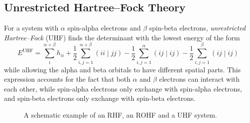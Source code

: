 \documentclass{article}
\theoremstyle{plain}\theoremheaderfont{\normalfont\itshape}\theorembodyfont{\rmfamily}\theoremseparator{.}\newtheorem*{rem}{Remark}\newtheorem*{ex}{Example}\newtheorem*{proof}{Proof}\newtheorem*{altp}{Alternative proof}
\theoremstyle{plain}\theoremheaderfont{\normalfont\bfseries}\theorembodyfont{\rmfamily}\theoremseparator{.}\newtheorem{thm}{Theorem}[section]\newtheorem{lem}[thm]{Lemma}\newtheorem{prop}[thm]{Proposition}\newtheorem*{cor}{Corollary}\newtheorem{defn}[thm]{Definition}\newtheorem{clm}[thm]{Claim}\newtheorem{clminproof}{Claim}
\theoremstyle{break}\theoremheaderfont{\normalfont\itshape}\theorembodyfont{\rmfamily}\theoremseparator{.\medskip}\newtheorem*{proofskip}{Proof}\newtheorem*{exs}{Examples}\newtheorem*{rems}{Remarks}
\theoremstyle{break}\theoremheaderfont{\normalfont\bfseries}\theorembodyfont{\rmfamily}\theoremseparator{.\medskip}\newtheorem{lemskip}[thm]{Lemma}\newtheorem{defnskip}[thm]{Definition}\newtheorem{propskip}[thm]{Proposition}\newtheorem{thmskip}[thm]{Theorem}
\numberwithin{equation}{section}
\newcommand{\bracket}[2]{\left( #1 \middle| #2 \right)}
\newcommand{\x}{_{\text{x}}}
\begin{document}
    \subsection{Unrestricted Hartree--Fock Theory}
    For a system with \(\alpha\) spin-alpha electrons and \(\beta\) spin-beta electrons, \textit{unrestricted Hartree--Fock} (UHF) finds the determinant with the lowest energy of the form
    \begin{equation}
        E^{\text{UHF}}=\sum_{i}^{\alpha+\beta}h_{ii}+\frac{1}{2}\sum_{i,j=1}^{\alpha+\beta}\bracket{ii}{jj}-\frac{1}{2}\sum_{i,j=1}^{\alpha}\bracket{ij}{ij}-\frac{1}{2}\sum_{i,j=1}^{\beta}\bracket{ij}{ij}
    \end{equation}
    while allowing the alpha and beta orbitals to have different spatial parts. This expression accounts for the fact that both \(\alpha\) and \(\beta\) electrons can interact with each other, while spin-alpha electrons only exchange with spin-alpha electrons, and spin-beta electrons only exchange with spin-beta electrons.
    
    \begin{figure}[ht!]
        \centering
        \caption{A schematic example of an RHF, an ROHF and a UHF system.}
    \end{figure}
\end{document}
